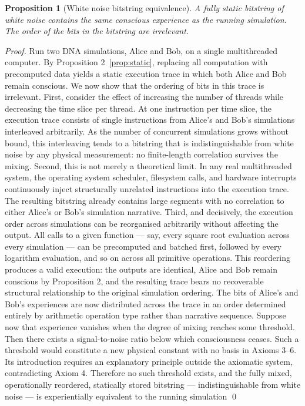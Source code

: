 \documentclass[12pt,a4paper]{article}
\newtheorem{proposition}{Proposition}
\begin{document}
\begin{proposition}[White noise bitstring equivalence]
\label{prop:noise}
A fully static bitstring of white noise contains the same conscious experience as the
running simulation. The order of the bits in the bitstring are irrelevant.
\end{proposition}

\begin{proof}
  Run two DNA simulations, Alice and Bob, on a single multithreaded computer.
  By Proposition 2~\ref{prop:static}, replacing all computation with precomputed data yields a static execution trace in which both Alice and Bob remain conscious.
  We now show that the ordering of bits in this trace is irrelevant.
  First, consider the effect of increasing the number of threads while decreasing the time slice per thread.
  At one instruction per time slice, the execution trace consists of single instructions from Alice's and Bob's simulations interleaved arbitrarily.
  As the number of concurrent simulations grows without bound, this interleaving tends to a bitstring that is indistinguishable from white noise by any physical measurement: no finite-length correlation survives the mixing.
  Second, this is not merely a theoretical limit.
  In any real multithreaded system, the operating system scheduler, filesystem calls, and hardware interrupts continuously inject structurally unrelated instructions into the execution trace.
  The resulting bitstring already contains large segments with no correlation to either Alice's or Bob's simulation narrative.
  Third, and decisively, the execution order across simulations can be reorganised arbitrarily without affecting the output.
  All calls to a given function — say, every square root evaluation across every simulation — can be precomputed and batched first, followed by every logarithm evaluation, and so on across all primitive operations.
  This reordering produces a valid execution: the outputs are identical, Alice and Bob remain conscious by Proposition 2, and the resulting trace bears no recoverable structural relationship to the original simulation ordering.
  The bits of Alice's and Bob's experiences are now distributed across the trace in an order determined entirely by arithmetic operation type rather than narrative sequence.
  Suppose now that experience vanishes when the degree of mixing reaches some threshold.
  Then there exists a signal-to-noise ratio below which consciousness ceases.
  Such a threshold would constitute a new physical constant with no basis in Axioms 3–6.
  Its introduction requires an explanatory principle outside the axiomatic system, contradicting Axiom 4.
  Therefore no such threshold exists, and the fully mixed, operationally reordered, statically stored bitstring — indistinguishable from white noise — is experientially equivalent to the running simulation \qed
\end{proof}
\end{document}
